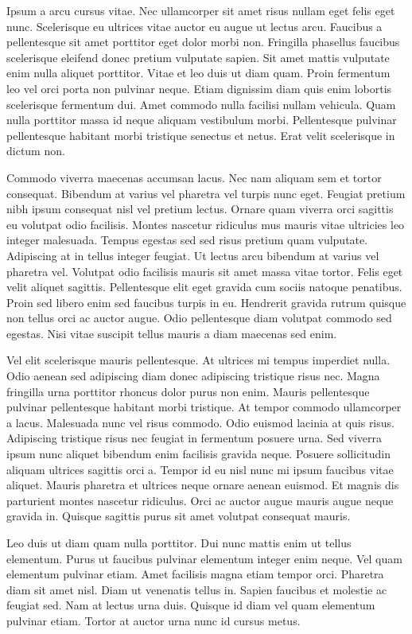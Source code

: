\documentclass[11pt,a4paper]{article}
\begin{document}
Ipsum a arcu cursus vitae. Nec ullamcorper sit amet risus nullam eget felis eget nunc. Scelerisque eu ultrices vitae auctor eu augue ut lectus arcu. Faucibus a pellentesque sit amet porttitor eget dolor morbi non. Fringilla phasellus faucibus scelerisque eleifend donec pretium vulputate sapien. Sit amet mattis vulputate enim nulla aliquet porttitor. Vitae et leo duis ut diam quam. Proin fermentum leo vel orci porta non pulvinar neque. Etiam dignissim diam quis enim lobortis scelerisque fermentum dui. Amet commodo nulla facilisi nullam vehicula. Quam nulla porttitor massa id neque aliquam vestibulum morbi. Pellentesque pulvinar pellentesque habitant morbi tristique senectus et netus. Erat velit scelerisque in dictum non.

Commodo viverra maecenas accumsan lacus. Nec nam aliquam sem et tortor consequat. Bibendum at varius vel pharetra vel turpis nunc eget. Feugiat pretium nibh ipsum consequat nisl vel pretium lectus. Ornare quam viverra orci sagittis eu volutpat odio facilisis. Montes nascetur ridiculus mus mauris vitae ultricies leo integer malesuada. Tempus egestas sed sed risus pretium quam vulputate. Adipiscing at in tellus integer feugiat. Ut lectus arcu bibendum at varius vel pharetra vel. Volutpat odio facilisis mauris sit amet massa vitae tortor. Felis eget velit aliquet sagittis. Pellentesque elit eget gravida cum sociis natoque penatibus. Proin sed libero enim sed faucibus turpis in eu. Hendrerit gravida rutrum quisque non tellus orci ac auctor augue. Odio pellentesque diam volutpat commodo sed egestas. Nisi vitae suscipit tellus mauris a diam maecenas sed enim.

Vel elit scelerisque mauris pellentesque. At ultrices mi tempus imperdiet nulla. Odio aenean sed adipiscing diam donec adipiscing tristique risus nec. Magna fringilla urna porttitor rhoncus dolor purus non enim. Mauris pellentesque pulvinar pellentesque habitant morbi tristique. At tempor commodo ullamcorper a lacus. Malesuada nunc vel risus commodo. Odio euismod lacinia at quis risus. Adipiscing tristique risus nec feugiat in fermentum posuere urna. Sed viverra ipsum nunc aliquet bibendum enim facilisis gravida neque. Posuere sollicitudin aliquam ultrices sagittis orci a. Tempor id eu nisl nunc mi ipsum faucibus vitae aliquet. Mauris pharetra et ultrices neque ornare aenean euismod. Et magnis dis parturient montes nascetur ridiculus. Orci ac auctor augue mauris augue neque gravida in. Quisque sagittis purus sit amet volutpat consequat mauris.

Leo duis ut diam quam nulla porttitor. Dui nunc mattis enim ut tellus elementum. Purus ut faucibus pulvinar elementum integer enim neque. Vel quam elementum pulvinar etiam. Amet facilisis magna etiam tempor orci. Pharetra diam sit amet nisl. Diam ut venenatis tellus in. Sapien faucibus et molestie ac feugiat sed. Nam at lectus urna duis. Quisque id diam vel quam elementum pulvinar etiam. Tortor at auctor urna nunc id cursus metus.
\end{document}
